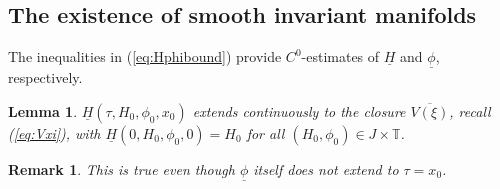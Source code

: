 \documentclass[reqno,12pt]{amsart}
\newcommand{\seclab}[1]{\label{sec:#1}}
\renewcommand{\eqref}[1]{(\ref{eq:#1})}
\newcommand{\lemmalab}[1]{\label{lemma:#1}}
\newtheorem{lemma}[theorem]{Lemma}
\newtheorem{remark}[theorem]{Remark}
\numberwithin{equation}{section}
\begin{document}
\subsection{The existence of smooth invariant manifolds}\seclab{43}
The inequalities in \eqref{Hphibound} provide $C^0$-estimates of $\underline H$ and $\underline \phi$, respectively. %
\begin{lemma}\lemmalab{contH0}
 $\underline H(\tau,H_0,\phi_0,x_0)$ extends continuously to the closure $\overline{V(\xi)}$, recall \eqref{Vxi}, with $\underline H(0,H_0,\phi_0,0)=H_0$ for all $(H_0,\phi_0)\in J\times \mathbb T$.
 \end{lemma}
\begin{remark}
 This is true even though $\underline \phi$ itself does not extend to $\tau=x_0$.
\end{remark}
\end{document}
